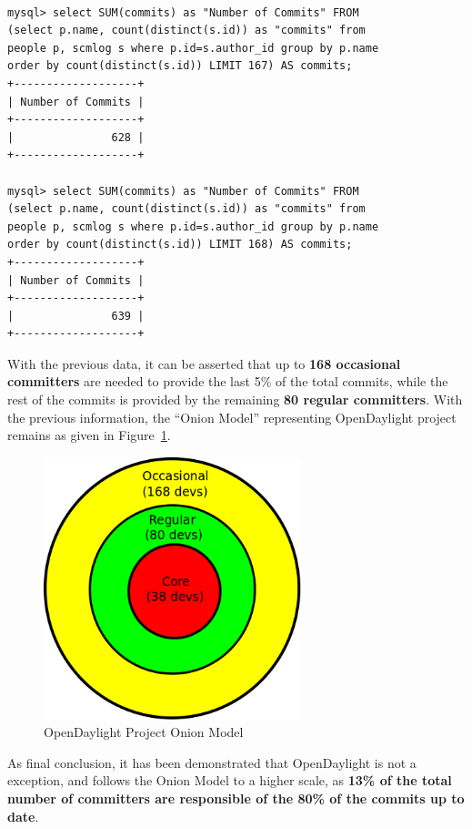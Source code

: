 \documentclass[a4paper, 12pt]{book}
\begin{document}
\begin{verbatim}

mysql> select SUM(commits) as "Number of Commits" FROM
(select p.name, count(distinct(s.id)) as "commits" from
people p, scmlog s where p.id=s.author_id group by p.name
order by count(distinct(s.id)) LIMIT 167) AS commits;
+-------------------+
| Number of Commits |
+-------------------+
|               628 |
+-------------------+

mysql> select SUM(commits) as "Number of Commits" FROM
(select p.name, count(distinct(s.id)) as "commits" from
people p, scmlog s where p.id=s.author_id group by p.name
order by count(distinct(s.id)) LIMIT 168) AS commits;
+-------------------+
| Number of Commits |
+-------------------+
|               639 |
+-------------------+

\end{verbatim}
With the previous data, it can be asserted that up to \textbf{168 occasional committers} are needed to provide the last 5\% of the total commits, while the rest of the commits is provided by the remaining \textbf{80 regular committers}. With the previous information, the ``Onion Model'' representing OpenDaylight project remains as given in Figure~\ref{fig:odl_onion_model}.
\begin{center}
 \begin{figure}
 \begin{center}
   \includegraphics[width=7.5cm]{img/onion01.png}
   \caption{OpenDaylight Project Onion Model}
   \label{fig:odl_onion_model}
 \end{center}
 \end{figure}
\end{center}
As final conclusion, it has been demonstrated that OpenDaylight is not a exception, and follows the Onion Model to a higher scale, as \textbf{13\% of the total number of committers are responsible of the 80\% of the commits up to date}.\\
\end{document}
